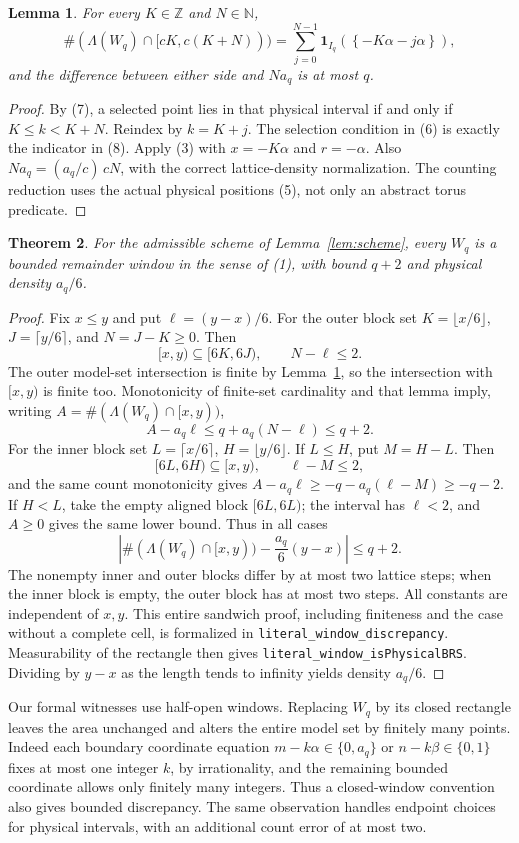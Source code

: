 \documentclass[11pt]{article}
\newtheorem{theorem}{Theorem}
\newtheorem{lemma}[theorem]{Lemma}
\newcommand{\fr}[1]{\left\{#1\right\}}
\newcommand{\Z}{\mathbb Z}
\begin{document}
\begin{lemma}\label{lem:block}
For every $K\in\Z$ and $N\in\mathbb N$,
\[
 \#(\Lambda(W_q)\cap[cK,c(K+N)))
 =\sum_{j=0}^{N-1}\mathbf1_{I_q}(\fr{-K\alpha-j\alpha}),
                                                        \tag{8}
\]
and the difference between either side and $Na_q$ is at most $q$.
\end{lemma}
\begin{proof}
By (7), a selected point lies in that physical interval if and only if
$K\le k<K+N$. Reindex by $k=K+j$. The selection condition in (6)
is exactly the indicator in (8). Apply (3) with $x=-K\alpha$ and
$r=-\alpha$. Also $Na_q=(a_q/c)\,cN$, with the correct lattice-density
normalization. The counting reduction uses the actual physical positions
(5), not only an abstract torus predicate.
\end{proof}

\begin{theorem}\label{thm:physical}
For the admissible scheme of Lemma~\ref{lem:scheme}, every $W_q$ is a
bounded remainder window in the sense of (1), with bound $q+2$ and
physical density $a_q/6$.
\end{theorem}
\begin{proof}
Fix $x\le y$ and put $\ell=(y-x)/6$. For the outer block set
$K=\lfloor x/6\rfloor$, $J=\lceil y/6\rceil$, and $N=J-K\ge0$.
Then
\[
 [x,y)\subseteq[6K,6J),\qquad N-\ell\le2.
\]
The outer model-set intersection is finite by Lemma~\ref{lem:block},
so the intersection with $[x,y)$ is finite too. Monotonicity of finite-set
cardinality and that lemma imply, writing $A=\#(\Lambda(W_q)\cap[x,y))$,
\[
 A-a_q\ell\le q+a_q(N-\ell)\le q+2.
\]
For the inner block set $L=\lceil x/6\rceil$, $H=\lfloor y/6\rfloor$.
If $L\le H$, put $M=H-L$. Then
\[
 [6L,6H)\subseteq[x,y),\qquad \ell-M\le2,
\]
and the same count monotonicity gives
$A-a_q\ell\ge-q-a_q(\ell-M)\ge-q-2$.
If $H<L$, take the empty aligned block $[6L,6L)$; the interval has
$\ell<2$, and $A\ge0$ gives the same lower bound.
Thus in all cases
\[
 \left|\#(\Lambda(W_q)\cap[x,y))-\frac{a_q}{6}(y-x)\right|
 \le q+2.
\]
The nonempty inner and outer blocks differ by at most two lattice steps;
when the inner block is empty, the outer block has at most two steps.
All constants are independent of $x,y$. This entire sandwich proof,
including finiteness and the case without a complete cell, is formalized
in \nolinkurl{literal_window_discrepancy}. Measurability of the rectangle
then gives \nolinkurl{literal_window_isPhysicalBRS}.
Dividing by $y-x$ as the length tends to infinity yields density $a_q/6$.
\end{proof}
Our formal witnesses use half-open windows. Replacing $W_q$ by its
closed rectangle leaves the area unchanged and alters the entire model
set by finitely many points. Indeed each boundary coordinate equation
$m-k\alpha\in\{0,a_q\}$ or $n-k\beta\in\{0,1\}$ fixes at most one
integer $k$, by irrationality, and the remaining bounded coordinate
allows only finitely many integers. Thus a closed-window convention also
gives bounded discrepancy. The same observation handles endpoint choices
for physical intervals, with an additional count error of at most two.
\end{document}
